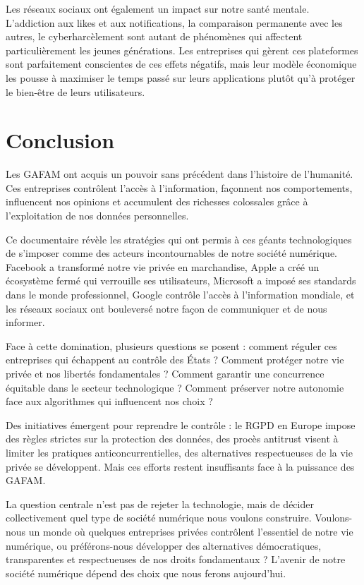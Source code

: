 \documentclass[12pt,a4paper]{article}
\begin{document}
Les réseaux sociaux ont également un impact sur notre santé mentale. L'addiction aux likes et aux notifications, la comparaison permanente avec les autres, le cyberharcèlement sont autant de phénomènes qui affectent particulièrement les jeunes générations. Les entreprises qui gèrent ces plateformes sont parfaitement conscientes de ces effets négatifs, mais leur modèle économique les pousse à maximiser le temps passé sur leurs applications plutôt qu'à protéger le bien-être de leurs utilisateurs.

\newpage

\section*{Conclusion}

Les GAFAM ont acquis un pouvoir sans précédent dans l'histoire de l'humanité. Ces entreprises contrôlent l'accès à l'information, façonnent nos comportements, influencent nos opinions et accumulent des richesses colossales grâce à l'exploitation de nos données personnelles.

Ce documentaire révèle les stratégies qui ont permis à ces géants technologiques de s'imposer comme des acteurs incontournables de notre société numérique. Facebook a transformé notre vie privée en marchandise, Apple a créé un écosystème fermé qui verrouille ses utilisateurs, Microsoft a imposé ses standards dans le monde professionnel, Google contrôle l'accès à l'information mondiale, et les réseaux sociaux ont bouleversé notre façon de communiquer et de nous informer.

Face à cette domination, plusieurs questions se posent : comment réguler ces entreprises qui échappent au contrôle des États ? Comment protéger notre vie privée et nos libertés fondamentales ? Comment garantir une concurrence équitable dans le secteur technologique ? Comment préserver notre autonomie face aux algorithmes qui influencent nos choix ?

Des initiatives émergent pour reprendre le contrôle : le RGPD en Europe impose des règles strictes sur la protection des données, des procès antitrust visent à limiter les pratiques anticoncurrentielles, des alternatives respectueuses de la vie privée se développent. Mais ces efforts restent insuffisants face à la puissance des GAFAM.

La question centrale n'est pas de rejeter la technologie, mais de décider collectivement quel type de société numérique nous voulons construire. Voulons-nous un monde où quelques entreprises privées contrôlent l'essentiel de notre vie numérique, ou préférons-nous développer des alternatives démocratiques, transparentes et respectueuses de nos droits fondamentaux ? L'avenir de notre société numérique dépend des choix que nous ferons aujourd'hui.
\end{document}
